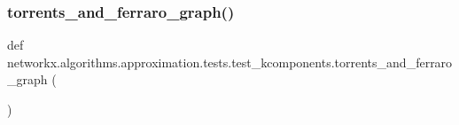 \subsubsection{\texorpdfstring{torrents\+\_\+and\+\_\+ferraro\+\_\+graph()}{torrents\_and\_ferraro\_graph()}}
{\footnotesize\ttfamily def networkx.\+algorithms.\+approximation.\+tests.\+test\+\_\+kcomponents.\+torrents\+\_\+and\+\_\+ferraro\+\_\+graph (\begin{DoxyParamCaption}{ }\end{DoxyParamCaption})}

